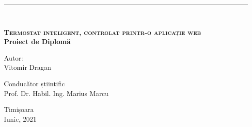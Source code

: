 \begin{titlepage}
    \noindent\rule{\textwidth}{1pt}\\[5cm]
    
    \begin{center}
        {\huge \bfseries \textsc{Termostat inteligent, controlat printr-o aplicație web}}\\[2cm]
        {\large \bfseries Proiect de Diplomă}\\[2cm]
        \begin{flushright}
            \large
            Autor:\\
	      Vitomir Dragan\\[1cm]
        \end{flushright}
        \begin{flushleft}
            \large
            Conducător științific\\
            Prof. Dr. Habil. Ing. Marius Marcu\\[2cm]
        \end{flushleft}
        {\small Timișoara \\Iunie, 2021}
    \end{center}
\end{titlepage}
\restoregeometry
\shipout\null